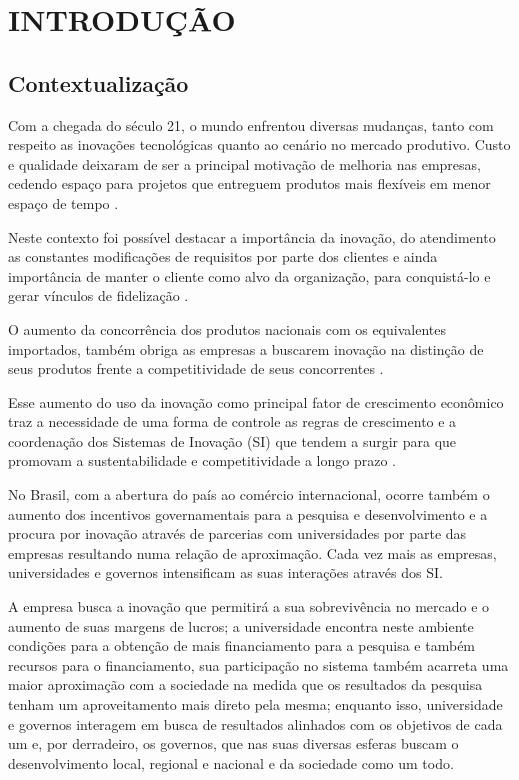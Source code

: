\chapter{INTRODUÇÃO}
\thispagestyle{empty}

\section{Contextualização}
Com a chegada do século 21, o mundo enfrentou diversas mudanças, tanto com respeito as inovações tecnológicas quanto ao cenário no mercado produtivo. Custo e qualidade deixaram de ser a principal motivação de melhoria nas empresas, cedendo espaço para projetos que entreguem produtos mais flexíveis em menor espaço de tempo \cite{yusuf2004agile}.

Neste contexto foi possível destacar a importância da inovação, do atendimento as constantes modificações de requisitos por parte dos clientes e ainda importância de manter o cliente como alvo da organização, para conquistá-lo e gerar vínculos de fidelização \cite{chiesa2007exploring}.

O aumento da concorrência dos produtos nacionais com os equivalentes importados, também obriga as empresas a buscarem inovação na distinção de seus produtos frente a competitividade de seus concorrentes \cite{atkinson2012global}.

Esse aumento do uso da inovação como principal fator de crescimento econômico traz a necessidade de uma forma de controle as regras de crescimento e a coordenação dos Sistemas de Inovação (SI) que tendem a surgir para que promovam a sustentabilidade e competitividade a longo prazo \cite{lundvall2010politicas}.

No Brasil, com a abertura do país ao comércio internacional, ocorre também o aumento dos incentivos governamentais para a pesquisa e desenvolvimento e a procura por inovação através de parcerias com universidades por parte das empresas resultando numa relação de aproximação. Cada vez mais as empresas, universidades e governos intensificam as suas interações através dos SI.

A empresa busca a inovação que permitirá a sua sobrevivência no mercado e o aumento de suas margens de lucros; a universidade encontra neste ambiente condições para a obtenção de mais financiamento para a pesquisa e também recursos para o financiamento, sua participação no sistema também acarreta uma maior aproximação com a sociedade na medida que os resultados da pesquisa tenham um aproveitamento mais direto pela mesma; enquanto isso, universidade e governos interagem em busca de resultados alinhados com os objetivos de cada um e, por derradeiro, os governos, que nas suas diversas esferas buscam o desenvolvimento local, regional e nacional e da sociedade como um todo.

